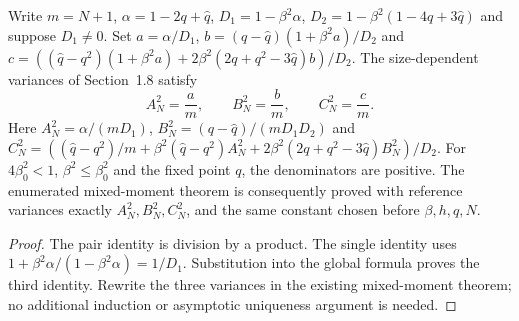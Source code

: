 \begin{lemma}
\label{lem:sg-tal:variance-identification}
\leanok
{}
Write $m=N+1$, $\alpha=1-2q+\hat q$, $D_1=1-\beta^2\alpha$,
$D_2=1-\beta^2(1-4q+3\hat q)$ and suppose $D_1\ne0$.
Set $a=\alpha/D_1$, $b=(q-\hat q)(1+\beta^2a)/D_2$ and
$c=((\hat q-q^2)(1+\beta^2a)+2\beta^2(2q+q^2-3\hat q)b)/D_2$.
The size-dependent variances of Section~1.8 satisfy
\[
 A_N^2=\frac{a}{m},\qquad B_N^2=\frac{b}{m},\qquad C_N^2=\frac{c}{m}.
\]
Here $A_N^2=\alpha/(mD_1)$, $B_N^2=(q-\hat q)/(mD_1D_2)$ and
$C_N^2=((\hat q-q^2)/m+\beta^2(\hat q-q^2)A_N^2
+2\beta^2(2q+q^2-3\hat q)B_N^2)/D_2$.
For $4\beta_0^2<1$, $\beta^2\le\beta_0^2$ and the fixed point $q$,
the denominators are positive. The enumerated mixed-moment theorem is consequently
proved with reference variances exactly $A_N^2,B_N^2,C_N^2$, and the same constant
chosen before $\beta,h,q,N$.
\end{lemma}
\begin{proof}
\leanok
The pair identity is division by a product. The single identity uses
$1+\beta^2\alpha/(1-\beta^2\alpha)=1/D_1$. Substitution into the global formula
proves the third identity. Rewrite the three variances in the existing mixed-moment
theorem; no additional induction or asymptotic uniqueness argument is needed.
\end{proof}


